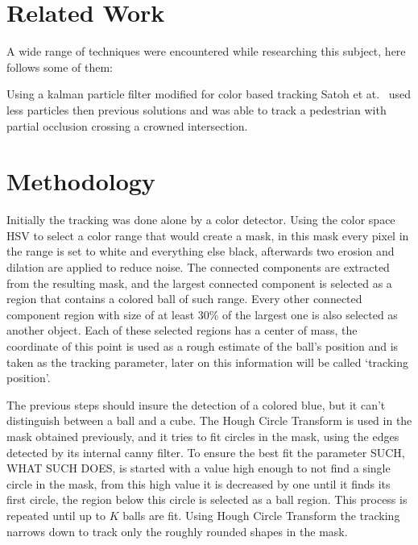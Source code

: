 \documentclass[10pt,twocolumn,letterpaper]{article}
\begin{document}

  \section{Related Work}\label{sec:work}

  A wide range of techniques were encountered while researching this subject,
  here follows some of them:

  \bigbreak{}
  Using a kalman particle filter modified for color based tracking
  Satoh et at.~\cite{satoh2004color} used less particles then previous solutions
  and was able to track a pedestrian with partial occlusion crossing a crowned
  intersection.

  \section{Methodology}\label{sec:method}

  Initially the tracking was done alone by a color detector. Using the color
  space HSV to select a color range that would create a mask, in this mask every
  pixel in the range is set to white and everything else black, afterwards two
  erosion and dilation are applied to reduce noise. The connected components
  are extracted from the resulting mask, and the largest connected component is
  selected as a region that contains a colored ball of such range. Every other
  connected component region with size of at least 30\% of the largest one is
  also selected as another object. Each of these selected regions has a center
  of mass, the coordinate of this point is used as a rough estimate of
  the ball's position and is taken as the tracking parameter, later on this
  information will be called `tracking position'.

  The previous steps should insure the detection of a colored blue, but it can't
  distinguish between a ball and a cube. The Hough Circle Transform is used in
  the mask obtained previously, and it tries to fit circles in the mask, using
  the edges detected by its internal canny filter. To ensure the best fit the
  parameter SUCH, WHAT SUCH DOES, is started with a value high enough to not
  find a single circle in the mask, from this high value it is decreased by one
  until it finds its first circle, the region below this circle is selected as a
  ball region. This process is repeated until up to $K$ balls are fit. Using
  Hough Circle Transform the tracking narrows down to track only the roughly
  rounded shapes in the mask.
\end{document}
